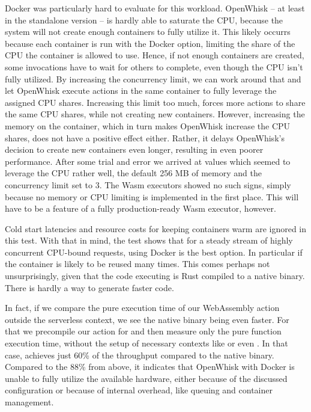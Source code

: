 Docker was particularly hard to evaluate for this workload. OpenWhisk -- at least in the standalone version -- is hardly able to saturate the CPU, because the system will not create enough containers to fully utilize it.
This likely occurrs because each container is run with the  Docker option, limiting the share of the CPU the container is allowed to use. Hence, if not enough containers are created, some invocations have to wait for others to complete, even though the CPU isn't fully utilized.
By increasing the concurrency limit, we can work around that and let OpenWhisk execute actions in the same container to fully leverage the assigned CPU shares. Increasing this limit too much, forces more actions to share the same CPU shares, while not creating new containers.
However, increasing the memory on the container, which in turn makes OpenWhisk increase the CPU shares, does not have a positive effect either. Rather, it delays OpenWhisk's decision to create new containers even longer, resulting in even poorer performance. After some trial and error we arrived at values which seemed to leverage the CPU rather well, the default 256 MB of memory and the concurrency limit set to 3.
The Wasm executors showed no such signs, simply because no memory or CPU limiting is implemented in the first place. This will have to be a feature of a fully production-ready Wasm executor, however.

Cold start latencies and resource costs for keeping containers warm are ignored in this test. With that in mind, the test shows that for a steady stream of highly concurrent CPU-bound requests, using Docker is the best option. In particular if the container is likely to be reused many times. This comes perhaps not unsurprisingly, given that the code executing is Rust compiled to a native  binary. There is hardly a way to generate faster code.

In fact, if we compare the pure execution time of our WebAssembly action outside the serverless context, we see the native binary being even faster. For that we precompile our action for  and then measure only the pure function execution time, without the setup of necessary contexts like  or even . In that case,  achieves just 60\% of the throughput compared to the native binary. Compared to the 88\% from above, it indicates that OpenWhisk with Docker is unable to fully utilize the available hardware, either because of the discussed configuration or because of internal overhead, like queuing and container management.

